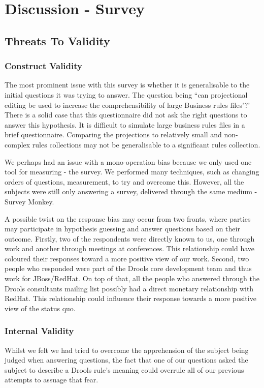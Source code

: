 \section{Discussion - Survey}

\subsection{Threats To Validity}  

\subsubsection{Construct Validity}
The most prominent issue with this survey is whether it is generalisable to the initial questions it was trying to answer.
The question being ``can projectional editing be used to increase the comprehensibility of large Business rules files'?'
There is a solid case that this questionnaire did not ask the right questions to answer this hypothesis.
It is difficult to simulate large business rules files in a brief questionnaire.
Comparing the projections to relatively small and non-complex rules collections may not be generalisable to a significant rules collection.

We perhaps had an issue with a mono-operation bias because we only used one tool for measuring - the survey.
We performed many techniques, such as changing orders of questions, measurement, to try and overcome this.
However, all the subjects were still only answering a survey, delivered through the same medium - Survey Monkey.

A possible twist on the response bias may occur from two fronts, where parties may participate in hypothesis guessing and answer questions based on their outcome.
Firstly, two of the respondents were directly known to us, one through work and another through meetings at conferences.
This relationship could have coloured their responses toward a more positive view of our work.
Second, two people who responded were part of the Drools core development team and thus work for JBoss/RedHat.
On top of that, all the people who answered through the Drools consultants mailing list possibly had a direct monetary relationship with RedHat.
This relationship could influence their response towards a more positive view of the status quo.

\subsubsection{Internal Validity}
Whilst we felt we had tried to overcome the apprehension of the subject being judged when answering questions, the fact that one of our questions asked the subject to describe a Drools rule's meaning could overrule all of our previous attempts to assuage that fear.

